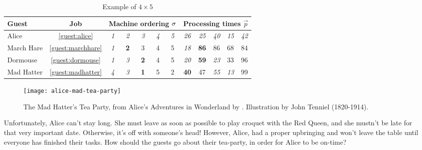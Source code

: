 \begin{table}[t]\centering
\caption{Example of $4\times5$ \JSP}\label{tbl:example}
\begin{tabular}{lc|ccccc|ccccc} \toprule
Guest & \multicolumn{1}{c}{Job} & \multicolumn{5}{c}{Machine ordering 
${\mathbf{\sigma}}$} & \multicolumn{5}{c}{Processing times $\vec{p}$} \\ \midrule
Alice & \ref{guest:alice} & \textit{1} & \textit{2} & \textit{3} & \textit{4} & 
\textit{5} & 
\textit{26} & \textit{25} & \textit{40} & \textit{15} & \textit{42} \\
March Hare & \ref{guest:marchhare} & \textit{1} & \textbf{2} & 3 & 4 & 5 & 
\textit{18} & \textbf{86} & 86 & 68 & 84 \\
Dormouse & \ref{guest:dormouse} & \textit{1} & \textit{3} & \textbf{2} & 4 & 5 
& 
\textit{20} & \textbf{59} & \textit{23} & 33 & 96 \\
Mad Hatter & \ref{guest:madhatter} & \textit{4} & \textit{3} & \textbf{1} & 5 & 
2 & \textbf{40} & 47 & \textit{55} & \textit{13} & 99 
\\
\bottomrule
\end{tabular}
\end{table}

\begin{figure}[b!]\centering 
    \texttt{[image: alice-mad-tea-party]}
    \caption{The Mad Hatter's Tea Party, from Alice's Adventures in Wonderland 
        by \citet{alice}. Illustration by John Tenniel 
        (1820-1914).}\label{fig:teaparty}
\end{figure}

Unfortunately, Alice can't stay long. She must leave as soon as possible to 
play croquet with the Red Queen, 
and she mustn't be late for that very important date. Otherwise, it's off with 
someone's head! However, Alice, had a proper upbringing and won't leave the 
table until everyone has finished their tasks. 
How should the guests go about their tea-party, in order for Alice to be 
on-time?

